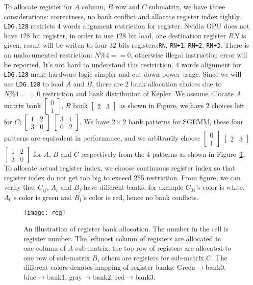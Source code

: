 To allocate register for $A$ column, $B$ row and $C$ submatrix, we have three considerations: correctness, no bank
conflict and allocate register index tightly.
{\tt LDG.128} restricts $4$ words alignment restriction for register.
Nvidia GPU does not have $128$ bit register, in order to use $128$ bit load, one destination register $RN$ is given, result will be writen to
four $32$ bits registers:{\tt RN}, {\tt RN+1}, {\tt RN+2}, {\tt RN+3}. There is an undocumented restriction: $N\%4==0$, otherwise illegal instruction error will be reported.
It's not hard to understand this restriction, $4$ words alignment for {\tt LDG.128} make hardware logic simpler and cut down power usage.
Since we will use {\tt LDG.128} to load $A$ and $B$, there are $2$ bank allocation choices due to $N\%4==0$ restriction and
bank distribution of Kepler. We assume allocate $A$ matrix bank $\begin{bmatrix} 0 \\ 1  \end{bmatrix}$,
$B$ bank $\begin{bmatrix} 2 & 3 \end{bmatrix}$ as shown in Figure, we have 2 choices left for $C$:
$\begin{bmatrix} 1 & 2 \\ 3 & 0  \end{bmatrix}$
$\begin{bmatrix} 3 & 1 \\ 0 & 2  \end{bmatrix}$.
We have $2\times2$ bank patterns for SGEMM, these four patterns are equivalent in performance, and we arbitrarily choose $\begin{bmatrix} 0 \\ 1  \end{bmatrix}$ $\begin{bmatrix} 2 & 3 \end{bmatrix}$
    $\begin{bmatrix} 1 & 2 \\ 3 & 0  \end{bmatrix}$ for $A$, $B$ and $C$ respectively from the $4$ patterns as shown in Figure~\ref{fig:reg}.
To allocate actual register index, we choose continuous register index so that register index do not get too big to
exceed 255 restriction. From figure, we can verify that $C_{ij}$, $A_i$ and $B_j$ have different banks, for example
$C_{01}$'s color is white, $A_0$'s color is green and $B_1$'s color is red, hence no bank conflicts.

\begin{figure}[htbp]
\begin{center}
\texttt{[image: reg]}
\caption{An illustration of register bank allocation. The number in the cell is register number.
    The leftmost column of registers are allocated to one column of $A$ sub-matrix, the
top row of registers are allocated to one row of sub-matrix $B$, others are registers for
sub-matrix $C$. The different colors denotes mapping of register banks: Green$\rightarrow$bank0, blue$\rightarrow$bank1, gray$\rightarrow$bank2, red$\rightarrow$bank3.}
\label{fig:reg}
\end{center}
\end{figure}


